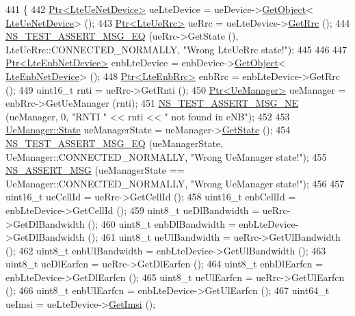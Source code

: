 \begin{DoxyCode}
441 \{
442   \hyperlink{classns3_1_1Ptr}{Ptr<LteUeNetDevice>} ueLteDevice = ueDevice->\hyperlink{classns3_1_1Object_a13e18c00017096c8381eb651d5bd0783}{GetObject}<
      \hyperlink{classns3_1_1LteUeNetDevice}{LteUeNetDevice}> ();
443   \hyperlink{classns3_1_1Ptr}{Ptr<LteUeRrc>} ueRrc = ueLteDevice->\hyperlink{classns3_1_1LteUeNetDevice_a1f84e8e99aeb10f4242bbfc7b57a8128}{GetRrc} ();
444   \hyperlink{group__testing_ga2a9d78cffb3db8e867c35fff0b698cf5}{NS\_TEST\_ASSERT\_MSG\_EQ} (ueRrc->GetState (), LteUeRrc::CONNECTED\_NORMALLY, \textcolor{stringliteral}{"Wrong
       LteUeRrc state!"});
445 
446 
447   \hyperlink{classns3_1_1Ptr}{Ptr<LteEnbNetDevice>} enbLteDevice = enbDevice->\hyperlink{classns3_1_1Object_a13e18c00017096c8381eb651d5bd0783}{GetObject}<
      \hyperlink{classns3_1_1LteEnbNetDevice}{LteEnbNetDevice}> ();
448   \hyperlink{classns3_1_1Ptr}{Ptr<LteEnbRrc>} enbRrc = enbLteDevice->GetRrc ();
449   uint16\_t rnti = ueRrc->GetRnti ();
450   \hyperlink{classns3_1_1Ptr}{Ptr<UeManager>} ueManager = enbRrc->GetUeManager (rnti);  
451   \hyperlink{group__testing_ga73d66fb0050a5111453fd144e767b91a}{NS\_TEST\_ASSERT\_MSG\_NE} (ueManager, 0, \textcolor{stringliteral}{"RNTI "} << rnti << \textcolor{stringliteral}{" not found in eNB"});
452 
453   \hyperlink{classns3_1_1UeManager_a2f4085fdd18d7125c27da44a5b8b6808}{UeManager::State} ueManagerState = ueManager->\hyperlink{classns3_1_1UeManager_a401868bb61523c594c69024e2231467a}{GetState} ();
454   \hyperlink{group__testing_ga2a9d78cffb3db8e867c35fff0b698cf5}{NS\_TEST\_ASSERT\_MSG\_EQ} (ueManagerState, UeManager::CONNECTED\_NORMALLY, \textcolor{stringliteral}{"Wrong
       UeManager state!"});
455   \hyperlink{assert_8h_aff5ece9066c74e681e74999856f08539}{NS\_ASSERT\_MSG} (ueManagerState == UeManager::CONNECTED\_NORMALLY, \textcolor{stringliteral}{"Wrong UeManager state!"});
456 
457   uint16\_t ueCellId = ueRrc->GetCellId ();
458   uint16\_t enbCellId = enbLteDevice->GetCellId ();
459   uint8\_t ueDlBandwidth = ueRrc->GetDlBandwidth ();
460   uint8\_t enbDlBandwidth = enbLteDevice->GetDlBandwidth ();
461   uint8\_t ueUlBandwidth = ueRrc->GetUlBandwidth ();
462   uint8\_t enbUlBandwidth = enbLteDevice->GetUlBandwidth ();
463   uint8\_t ueDlEarfcn = ueRrc->GetDlEarfcn ();
464   uint8\_t enbDlEarfcn = enbLteDevice->GetDlEarfcn ();
465   uint8\_t ueUlEarfcn = ueRrc->GetUlEarfcn ();
466   uint8\_t enbUlEarfcn = enbLteDevice->GetUlEarfcn ();
467   uint64\_t ueImsi = ueLteDevice->\hyperlink{classns3_1_1LteUeNetDevice_a673405bfed4b45c5714f17b0c3bad334}{GetImsi} ();

\end{DoxyCode}
